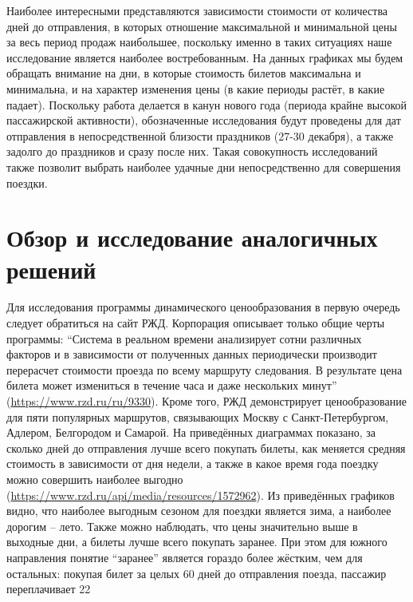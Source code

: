 \documentclass[conference]{IEEEtran}
\begin{document}
Наиболее интересными представляются зависимости стоимости от количества дней до отправления, в которых отношение максимальной и минимальной цены за весь период продаж наибольшее, поскольку именно в таких ситуациях наше исследование является наиболее востребованным. На данных графиках мы будем обращать внимание на дни, в которые стоимость билетов максимальна и минимальна, и на характер изменения цены (в какие периоды растёт, в какие падает). Поскольку работа делается в канун нового года (периода крайне высокой пассажирской активности), обозначенные исследования будут проведены для дат отправления в непосредственной близости праздников (27-30 декабря), а также задолго до праздников и сразу после них. Такая совокупность исследований также позволит выбрать наиболее удачные дни непосредственно для совершения поездки.

\section{Обзор и исследование аналогичных решений}

Для исследования программы динамического ценообразования в первую очередь следует обратиться на сайт РЖД. Корпорация описывает только общие черты программы: ``Система в реальном времени анализирует сотни различных факторов и в зависимости от полученных данных периодически производит перерасчет стоимости проезда по всему маршруту следования. В результате цена билета может измениться в течение часа и даже нескольких минут'' (\href{https://www.rzd.ru/ru/9330}{https://www.rzd.ru/ru/9330}).
Кроме того, РЖД демонстрирует ценообразование для пяти популярных маршрутов, связывающих Москву с Санкт-Петербургом, Адлером, Белгородом и Самарой. На приведённых диаграммах показано, за сколько дней до отправления лучше всего покупать билеты, как меняется средняя стоимость в зависимости от дня недели, а также в какое время года поездку можно совершить наиболее выгодно (\href{https://www.rzd.ru/api/media/resources/1572962}{https://www.rzd.ru/api/media/resources/1572962}).
Из приведённых графиков видно, что наиболее выгодным сезоном для поездки является зима, а наиболее дорогим -- лето. Также можно наблюдать, что цены значительно выше в выходные дни, а билеты лучше всего покупать заранее. При этом для южного направления понятие ``заранее'' является гораздо более жёстким, чем для остальных: покупая билет за целых 60 дней до отправления поезда, пассажир переплачивает 22\\%
\end{document}
